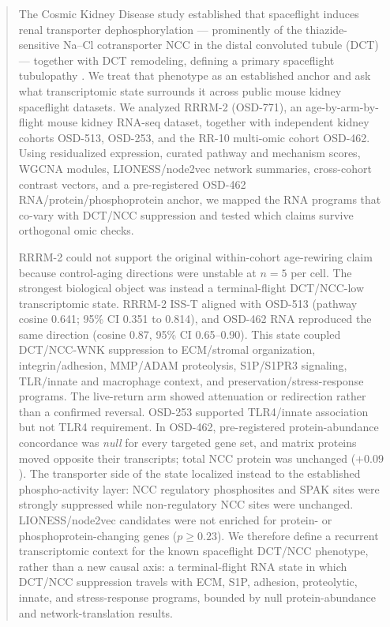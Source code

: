\documentclass[11pt]{article}
\begin{document}
\begin{abstract}
\noindent
The Cosmic Kidney Disease study established that spaceflight induces renal transporter dephosphorylation --- prominently of the thiazide-sensitive Na--Cl cotransporter NCC in the distal convoluted tubule (DCT) --- together with DCT remodeling, defining a primary spaceflight tubulopathy \citep{siew2024cosmic}. We treat that phenotype as an established anchor and ask what transcriptomic state surrounds it across public mouse kidney spaceflight datasets. We analyzed RRRM-2 (OSD-771), an age-by-arm-by-flight mouse kidney RNA-seq dataset, together with independent kidney cohorts OSD-513, OSD-253, and the RR-10 multi-omic cohort OSD-462. Using residualized expression, curated pathway and mechanism scores, WGCNA modules, LIONESS/node2vec network summaries, cross-cohort contrast vectors, and a pre-registered OSD-462 RNA/protein/phosphoprotein anchor, we mapped the RNA programs that co-vary with DCT/NCC suppression and tested which claims survive orthogonal omic checks.

RRRM-2 could not support the original within-cohort age-rewiring claim because control-aging directions were unstable at $n=5$ per cell. The strongest biological object was instead a terminal-flight DCT/NCC-low transcriptomic state. RRRM-2 ISS-T aligned with OSD-513 (pathway cosine 0.641; 95\% CI 0.351 to 0.814), and OSD-462 RNA reproduced the same direction (cosine 0.87, 95\% CI 0.65--0.90). This state coupled DCT/NCC-WNK suppression to ECM/stromal organization, integrin/adhesion, MMP/ADAM proteolysis, S1P/S1PR3 signaling, TLR/innate and macrophage context, and preservation/stress-response programs. The live-return arm showed attenuation or redirection rather than a confirmed reversal. OSD-253 supported TLR4/innate association but not TLR4 requirement. In OSD-462, pre-registered protein-abundance concordance was \emph{null} for every targeted gene set, and matrix proteins moved opposite their transcripts; total NCC protein was unchanged ($+0.09$). The transporter side of the state localized instead to the established phospho-activity layer: NCC regulatory phosphosites and SPAK sites were strongly suppressed while non-regulatory NCC sites were unchanged. LIONESS/node2vec candidates were not enriched for protein- or phosphoprotein-changing genes ($p\geq0.23$). We therefore define a recurrent transcriptomic context for the known spaceflight DCT/NCC phenotype, rather than a new causal axis: a terminal-flight RNA state in which DCT/NCC suppression travels with ECM, S1P, adhesion, proteolytic, innate, and stress-response programs, bounded by null protein-abundance and network-translation results.
\end{abstract}
\end{document}
